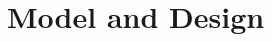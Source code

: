 \documentclass[final]{IEEEtran}
\begin{document}








\section{Model and Design}

\label{sec:model}
\end{document}

